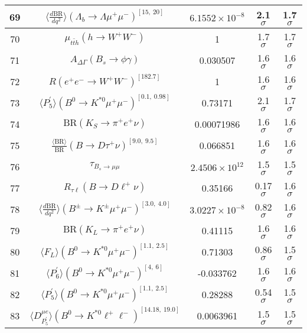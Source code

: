 \begin{longtable}{|c|c|c|c|c|}
69 &	 $\langle \frac{d\mathrm{BR}}{dq^2} \rangle(\Lambda_b\to\Lambda \mu^+\mu^-)^{[15,\  20]}$ &	 $6.1552\times 10^{-8}$ &	 \cellcolor{red!16}2.1 $ \sigma$ &	 1.7 $ \sigma$ \\ \hline
70 &	 $\mu_{t\bar t h}(h \to W^+W^-)$ &	 1 &	 \cellcolor{green!0}1.7 $ \sigma$ &	 1.7 $ \sigma$ \\ \hline
71 &	 $A_{\Delta\Gamma}(B_s\to \phi\gamma)$ &	 0.030507 &	 \cellcolor{red!0}1.6 $ \sigma$ &	 1.6 $ \sigma$ \\ \hline
72 &	 $R(e^+e^- \to W^+W^-)^{[182.7]}$ &	 1 &	 \cellcolor{red!0}1.6 $ \sigma$ &	 1.6 $ \sigma$ \\ \hline
73 &	 $\langle P_5^\prime\rangle(B^0\to K^{\ast 0}\mu^+\mu^-)^{[0.1,\  0.98]}$ &	 0.73171 &	 \cellcolor{red!21}2.1 $ \sigma$ &	 1.7 $ \sigma$ \\ \hline
74 &	 $\mathrm{BR}(K_S\to \pi^+e^+\nu)$ &	 0.00071986 &	 \cellcolor{red!0}1.6 $ \sigma$ &	 1.6 $ \sigma$ \\ \hline
75 &	 $\frac{\langle \mathrm{BR} \rangle}{\mathrm{BR}}(B\to D\tau^+\nu)^{[9.0,\  9.5]}$ &	 0.066851 &	 \cellcolor{green!0}1.6 $ \sigma$ &	 1.6 $ \sigma$ \\ \hline
76 &	 $\tau_{B_s \to \mu\mu}$ &	 $2.4506\times 10^{12}$ &	 \cellcolor{red!0}1.5 $ \sigma$ &	 1.5 $ \sigma$ \\ \hline
77 &	 $R_{\tau \ell}(B\to D\ell^+\nu)$ &	 0.35166 &	 \cellcolor{green!50}0.17 $ \sigma$ &	 1.6 $ \sigma$ \\ \hline
78 &	 $\langle \frac{d\mathrm{BR}}{dq^2} \rangle(B^\pm\to K^\pm \mu^+\mu^-)^{[3.0,\  4.0]}$ &	 $3.0227\times 10^{-8}$ &	 \cellcolor{green!39}0.82 $ \sigma$ &	 1.6 $ \sigma$ \\ \hline
79 &	 $\mathrm{BR}(K_L\to \pi^+e^+\nu)$ &	 0.41115 &	 \cellcolor{red!0}1.6 $ \sigma$ &	 1.6 $ \sigma$ \\ \hline
80 &	 $\langle F_L\rangle(B^0\to K^{\ast 0}\mu^+\mu^-)^{[1.1,\  2.5]}$ &	 0.71303 &	 \cellcolor{green!34}0.86 $ \sigma$ &	 1.5 $ \sigma$ \\ \hline
81 &	 $\langle P_6^\prime\rangle(B^0\to K^{\ast 0}\mu^+\mu^-)^{[4,\  6]}$ &	 -0.033762 &	 \cellcolor{green!1}1.6 $ \sigma$ &	 1.6 $ \sigma$ \\ \hline
82 &	 $\langle P_5^\prime\rangle(B^0\to K^{\ast 0}\mu^+\mu^-)^{[1.1,\  2.5]}$ &	 0.28288 &	 \cellcolor{green!49}0.54 $ \sigma$ &	 1.5 $ \sigma$ \\ \hline
83 &	 $\langle D_{P_5^\prime}^{\mu e} \rangle(B^0\to K^{\ast 0}\ell^+\ell^-)^{[14.18,\  19.0]}$ &	 0.0063961 &	 \cellcolor{green!0}1.5 $ \sigma$ &	 1.5 $ \sigma$ \\ \hline

\end{longtable}
